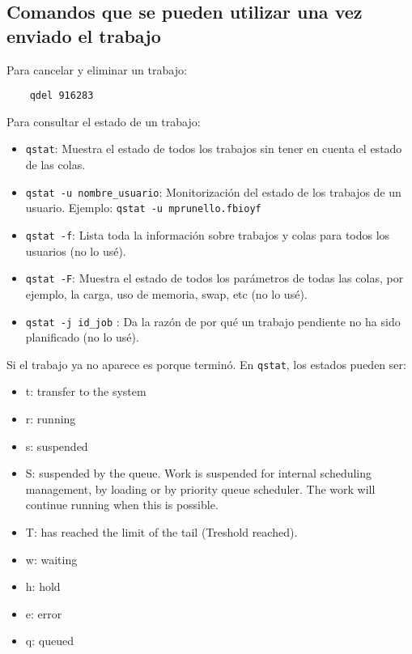 \documentclass[paper=a4, fontsize=11pt]{article} %
\numberwithin{equation}{section} %
\numberwithin{figure}{section} %
\numberwithin{table}{section} %
\begin{document}
\subsection{Comandos que se pueden utilizar una vez enviado el trabajo}

Para cancelar y eliminar un trabajo:

\begin{verbatim}
	qdel 916283
\end{verbatim}

Para consultar el estado de un trabajo:

\begin{itemize}
	\item \texttt{qstat}: Muestra el estado de todos los trabajos sin tener en cuenta el estado de las colas.
	\item \texttt{qstat -u nombre\_usuario}: Monitorización del estado de los trabajos de un usuario. Ejemplo: \texttt{qstat -u mprunello.fbioyf}
	\item \texttt{qstat -f}: Lista toda la información sobre trabajos y colas para todos los usuarios (no lo usé).
	\item \texttt{qstat -F}: Muestra el estado de todos los parámetros de todas las colas, por ejemplo, la carga, uso de memoria, swap, etc (no lo usé).
	\item \texttt{qstat -j id\_job} : Da la razón de por qué un trabajo pendiente no ha sido planificado (no lo usé).
\end{itemize}

Si el trabajo ya no aparece es porque terminó. En \texttt{qstat}, los estados pueden ser:

\begin{itemize}
	\item t: transfer to the system
	\item r: running
	\item s: suspended
	\item S: suspended by the queue. Work is suspended for internal scheduling management, by loading or by priority queue scheduler. The work will continue running when this is possible.
	\item T: has reached the limit of the tail (Treshold reached).
	\item w: waiting
	\item h: hold
	\item e: error
	\item q: queued
\end{itemize}
\end{document}
